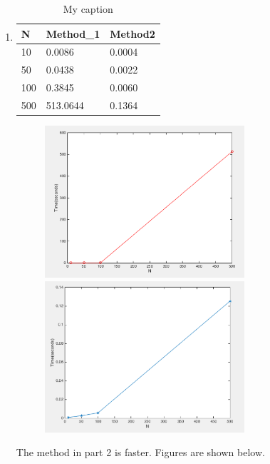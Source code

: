 \documentclass{article}
\begin{document}
\begin{enumerate}
\item 
\begin{table}[!htbp]
\centering
\caption{My caption}
\label{my-label}
\begin{tabular}{lll}
\hline
N   & Method\_1 & Method2 \\  \hline
10  & 0.0086    & 0.0004  \\ \hline
50  & 0.0438    & 0.0022  \\ \hline
100 & 0.3845    & 0.0060  \\ \hline
500 & 513.0644  & 0.1364  \\ \hline
\end{tabular}
\end{table}
\begin{figure}
\includegraphics[width=0.7\textwidth]{method1} 
\includegraphics[width=0.7\textwidth]{method2} 
\end{figure} 
The method in part 2 is faster. Figures are shown below. \\



\end{enumerate}
\end{document}
